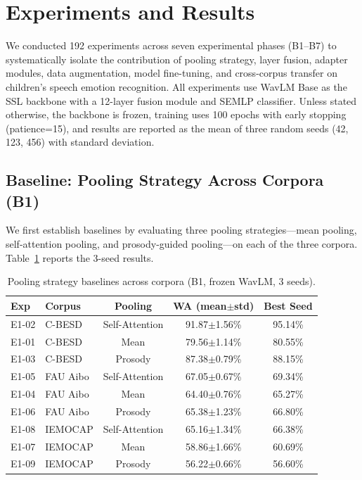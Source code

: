 \section{Experiments and Results}

We conducted 192 experiments across seven experimental phases (B1--B7) to systematically isolate the contribution of pooling strategy, layer fusion, adapter modules, data augmentation, model fine-tuning, and cross-corpus transfer on children's speech emotion recognition. All experiments use WavLM Base as the SSL backbone with a 12-layer fusion module and SEMLP classifier. Unless stated otherwise, the backbone is frozen, training uses 100 epochs with early stopping (patience=15), and results are reported as the mean of three random seeds (42, 123, 456) with standard deviation.

\subsection{Baseline: Pooling Strategy Across Corpora (B1)}

We first establish baselines by evaluating three pooling strategies---mean pooling, self-attention pooling, and prosody-guided pooling---on each of the three corpora. Table~\ref{tab:b1} reports the 3-seed results.

\begin{table}[h]
\centering
\caption{Pooling strategy baselines across corpora (B1, frozen WavLM, 3 seeds).}
\label{tab:b1}
\begin{tabular}{llccc}
\toprule
\textbf{Exp} & \textbf{Corpus} & \textbf{Pooling} & \textbf{WA (mean$\pm$std)} & \textbf{Best Seed} \\
\midrule
E1-02 & C-BESD & Self-Attention & 91.87$\pm$1.56\% & 95.14\% \\
E1-01 & C-BESD & Mean           & 79.56$\pm$1.14\% & 80.55\% \\
E1-03 & C-BESD & Prosody        & 87.38$\pm$0.79\% & 88.15\% \\
\addlinespace
E1-05 & FAU Aibo & Self-Attention & 67.05$\pm$0.67\% & 69.34\% \\
E1-04 & FAU Aibo & Mean           & 64.40$\pm$0.76\% & 65.27\% \\
E1-06 & FAU Aibo & Prosody        & 65.38$\pm$1.23\% & 66.80\% \\
\addlinespace
E1-08 & IEMOCAP & Self-Attention  & 65.16$\pm$1.34\% & 66.38\% \\
E1-07 & IEMOCAP & Mean            & 58.86$\pm$1.66\% & 60.69\% \\
E1-09 & IEMOCAP & Prosody         & 56.22$\pm$0.66\% & 56.60\% \\
\bottomrule
\end{tabular}
\end{table}

